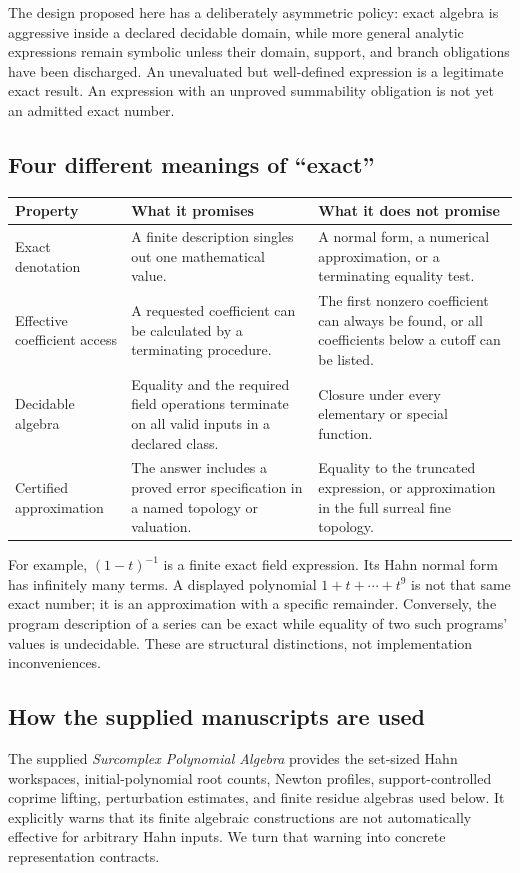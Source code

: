 \documentclass[11pt,letterpaper]{article}
\numberwithin{equation}{section}
\theoremstyle{definition}
\theoremstyle{remark}\newtheorem{remark}[theorem]{Remark}
\begin{document}
The design proposed here has a deliberately asymmetric policy: exact algebra
is aggressive inside a declared decidable domain, while more general analytic
expressions remain symbolic unless their domain, support, and branch obligations
have been discharged. An unevaluated but well-defined expression is a legitimate
exact result. An expression with an unproved summability obligation is not yet
an admitted exact number.

\subsection{Four different meanings of ``exact''}
\label{subsec:exact}
\begin{longtable}{@{}P{0.21\textwidth}P{0.35\textwidth}P{0.36\textwidth}@{}}
\toprule
Property & What it promises & What it does not promise\\
\midrule\endhead
Exact denotation & A finite description singles out one mathematical value. &
A normal form, a numerical approximation, or a terminating equality test.\\[0.5em]
Effective coefficient access & A requested coefficient can be calculated by a
terminating procedure. & The first nonzero coefficient can always be found,
or all coefficients below a cutoff can be listed.\\[0.5em]
Decidable algebra & Equality and the required field operations terminate on
all valid inputs in a declared class. & Closure under every elementary or
special function.\\[0.5em]
Certified approximation & The answer includes a proved error specification
in a named topology or valuation. & Equality to the truncated expression, or
approximation in the full surreal fine topology.\\
\bottomrule
\end{longtable}
For example, $(1-t)^{-1}$ is a finite exact field expression. Its Hahn normal
form has infinitely many terms. A displayed polynomial
$1+t+\cdots+t^9$ is not that same exact number; it is an approximation with a
specific remainder. Conversely, the program description of a series can be
exact while equality of two such programs' values is undecidable. These are
structural distinctions, not implementation inconveniences.

\subsection{How the supplied manuscripts are used}
\label{subsec:sources}
The supplied \emph{Surcomplex Polynomial Algebra} \cite{SourcePolynomial}
provides the set-sized Hahn workspaces, initial-polynomial root counts,
Newton profiles, support-controlled coprime lifting, perturbation estimates,
and finite residue algebras used below. It explicitly warns that its finite
algebraic constructions are not automatically effective for arbitrary Hahn
inputs. We turn that warning into concrete representation contracts.
\end{document}
